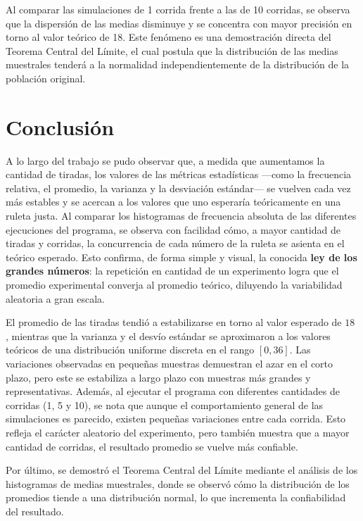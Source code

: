\documentclass{article}
\begin{document}
Al comparar las simulaciones de 1 corrida frente a las de 10 corridas, se observa que la dispersión de las medias disminuye y se concentra con mayor precisión en torno al valor teórico de 18. Este fenómeno es una demostración directa del Teorema Central del Límite, el cual postula que la distribución de las medias muestrales tenderá a la normalidad independientemente de la distribución de la población original.

\section{Conclusión}

A lo largo del trabajo se pudo observar que, a medida que aumentamos la cantidad de tiradas, los valores de las métricas estadísticas —como la frecuencia relativa, el promedio, la varianza y la desviación estándar— se vuelven cada vez más estables y se acercan a los valores que uno esperaría teóricamente en una ruleta justa. Al comparar los histogramas de frecuencia absoluta de las diferentes ejecuciones del programa, se observa con facilidad cómo, a mayor cantidad de tiradas y corridas, la concurrencia de cada número de la ruleta se asienta en el teórico esperado. Esto confirma, de forma simple y visual, la conocida \textbf{ley de los grandes números}: la repetición en cantidad de un experimento logra que el promedio experimental converja al promedio teórico, diluyendo la variabilidad aleatoria a gran escala.

El promedio de las tiradas tendió a estabilizarse en torno al valor esperado de $18$ , mientras que la varianza y el desvío estándar se aproximaron a los valores teóricos de una distribución uniforme discreta en el rango $[0, 36]$. Las variaciones observadas en pequeñas muestras demuestran el azar en el corto plazo, pero este se estabiliza a largo plazo con muestras más grandes y representativas. Además, al ejecutar el programa con diferentes cantidades de corridas (1, 5 y 10), se nota que aunque el comportamiento general de las simulaciones es parecido, existen pequeñas variaciones entre cada corrida. Esto refleja el carácter aleatorio del experimento, pero también muestra que a mayor cantidad de corridas, el resultado promedio se vuelve más confiable.
 
Por último, se demostró el Teorema Central del Límite mediante el análisis de los histogramas de medias muestrales, donde se observó cómo la distribución de los promedios tiende a una distribución normal, lo que incrementa la confiabilidad del resultado.
\end{document}
